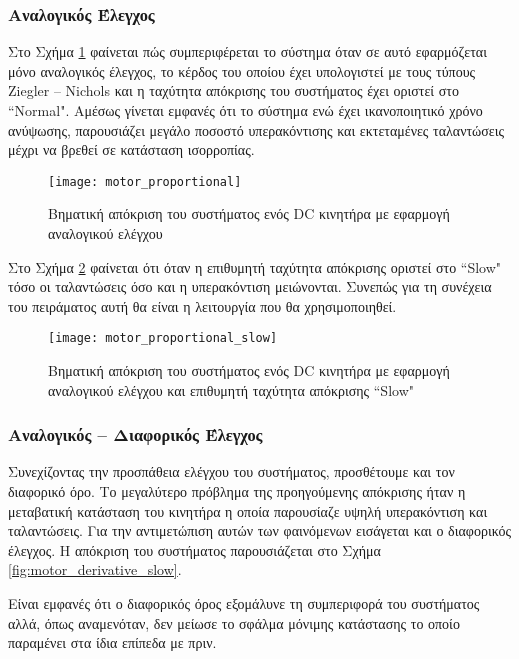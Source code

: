 \subsubsection{Αναλογικός Έλεγχος}

Στο Σχήμα \ref{fig:motor_proportional} φαίνεται πώς συμπεριφέρεται το σύστημα όταν σε αυτό εφαρμόζεται μόνο αναλογικός έλεγχος, το κέρδος του οποίου έχει υπολογιστεί με τους τύπους Ziegler -- Nichols και η ταχύτητα απόκρισης του συστήματος έχει οριστεί στο ``Normal". Αμέσως γίνεται εμφανές ότι το σύστημα ενώ έχει ικανοποιητικό χρόνο ανύψωσης, παρουσιάζει μεγάλο ποσοστό υπερακόντισης και εκτεταμένες ταλαντώσεις μέχρι να βρεθεί σε κατάσταση ισορροπίας.

\begin{figure}[h]
  \centering
  \texttt{[image: motor\_proportional]}
  \caption{Βηματική απόκριση του συστήματος ενός DC κινητήρα με εφαρμογή αναλογικού ελέγχου}
  \label{fig:motor_proportional}
\end{figure}

Στο Σχήμα \ref{fig:motor_proportional_slow} φαίνεται ότι όταν η επιθυμητή ταχύτητα απόκρισης οριστεί στο ``Slow" τόσο οι ταλαντώσεις όσο και η υπερακόντιση μειώνονται. Συνεπώς για τη συνέχεια του πειράματος αυτή θα είναι η λειτουργία που θα χρησιμοποιηθεί.

\begin{figure}[h]
  \centering
  \texttt{[image: motor\_proportional\_slow]}
  \caption{Βηματική απόκριση του συστήματος ενός DC κινητήρα με εφαρμογή αναλογικού ελέγχου και επιθυμητή ταχύτητα απόκρισης ``Slow"}
  \label{fig:motor_proportional_slow}
\end{figure}

\subsubsection{Αναλογικός  --  Διαφορικός Έλεγχος}

Συνεχίζοντας την προσπάθεια ελέγχου του συστήματος, προσθέτουμε και τον διαφορικό όρο. Το μεγαλύτερο πρόβλημα της προηγούμενης απόκρισης ήταν η μεταβατική κατάσταση του κινητήρα η οποία παρουσίαζε υψηλή υπερακόντιση και ταλαντώσεις. Για την αντιμετώπιση αυτών των φαινόμενων εισάγεται και ο διαφορικός έλεγχος. Η απόκριση του συστήματος παρουσιάζεται στο Σχήμα \ref{fig:motor_derivative_slow}.

Είναι εμφανές ότι ο διαφορικός όρος εξομάλυνε τη συμπεριφορά του συστήματος αλλά, όπως αναμενόταν, δεν μείωσε το σφάλμα μόνιμης κατάστασης το οποίο παραμένει στα ίδια επίπεδα με πριν.

